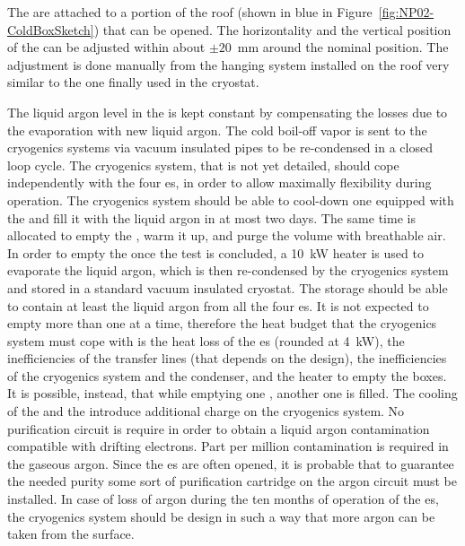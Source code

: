 The  are attached to a portion of the roof (shown in blue in Figure~\ref{fig:NP02-ColdBoxSketch}) that can be opened.
The horizontality and the vertical position of the  can be adjusted within about $\pm 20$~mm around the nominal position.
The adjustment is done manually from the hanging system installed on the  \coldbox roof very similar to the one finally used in the cryostat.

The liquid argon level in the  \coldbox is kept constant by compensating the losses due to the evaporation with new liquid argon.
The cold boil-off vapor is sent to the cryogenics systems via vacuum insulated pipes to be re-condensed in a closed loop cycle.
The cryogenics system, that is not yet detailed, should cope independently with the four  \coldbox{}es, in order to allow maximally flexibility during operation.
The cryogenics system should be able to cool-down one  \coldbox equipped with the  and fill it with the liquid argon in at most two days.
The same time is allocated to empty the \coldbox, warm it up, and purge the volume with breathable air.
In order to empty the  \coldbox once the test is concluded, a 10~kW heater is used to evaporate the liquid argon, which is then re-condensed by the cryogenics system and stored in a standard vacuum insulated cryostat.
The storage should be able to contain at least the liquid argon from all the four  \coldbox{}es.
It is not expected to empty more than one  \coldbox at a time, therefore the heat budget that the cryogenics system must cope with is the heat loss of the  \coldbox{}es (rounded at 4~kW), the inefficiencies of the transfer lines (that depends on the design), the inefficiencies of the cryogenics system and the condenser, and the heater to empty the boxes.
It is possible, instead, that while emptying one  \coldbox, another one is filled.
The cooling of the  \coldbox and the  introduce additional charge on the cryogenics system.
No purification circuit is require in order to obtain a liquid argon contamination compatible with drifting electrons.
Part per million contamination is required in the gaseous argon.
Since the  \coldbox{}es are often opened, it is probable that to guarantee the needed purity some sort of purification cartridge on the argon circuit must be installed.
In case of loss of argon during the ten months of operation of the  \coldbox{}es, the cryogenics system should be design in such a way that more argon can be taken from the surface.

